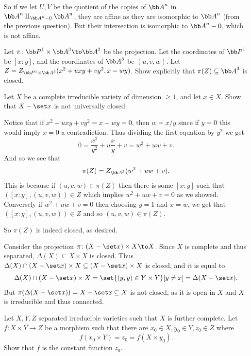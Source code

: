     So if we let $U,V$ be the quotient of the copies of $\bA^n$ in $\bA^n\amalg_{\bA^n-0}\bA^n$, they are affine as they are isomorphic to $\bA^n$ (from the previous question).
    But their intersection is isomorphic to $\bA^n-0$, which is not affine.
\eenum


\bprob

    \benum
        \item Let $\pi\colon\bP^1\times\bA^3\to\bA^3$ be the projection.
        Let the coordinates of $\bP^1$ be $[x:y]$, and the coordinates of $\bA^3$ be $(u,v,w)$.
        Let $Z=Z_{\bP^1\times\bA^3}(x^2+uxy+vy^2,x-wy)$.
        Show explicitly that $\pi(Z)\subseteq\bA^3$ is closed.

        \item Let $X$ be a complete irreducible variety of dimension $\geq1$, and let $x\in X$.
        Show that $X-\set x$ is not universally closed.
    \eenum

\eprob

\benum
    \item Notice that if $x^2+uxy+vy^2=x-wy=0$, then $w=x/y$ since if $y=0$ this would imply $x=0$ a contradiction.
    Thus dividing the first equation by $y^2$ we get
    $$ 0 = \frac{x^2}{y^2} + u\frac xy + v = w^2 + uw + v . $$
    And so we see that
    $$ \pi(Z) = Z_{\bA^3}(w^2+uw+v) . $$
    This is because if $(u,v,w)\in\pi(Z)$ then there is some $[x:y]$ such that $([x:y],(u,v,w))\in Z$ which implies $w^2+uw+v=0$ as we showed.
    Conversely if $w^2+uw+v=0$ then choosing $y=1$ and $x=w$, we get that $([x:y],(u,v,w))\in Z$ and so $(u,v,w)\in\pi(Z)$.

    So $\pi(Z)$ is indeed closed, as desired.

    \item Consider the projection $\pi\colon(X-\set x)\times X\to X$.
    Since $X$ is complete and thus separated, $\Delta(X)\subseteq X\times X$ is closed.
    Thus $\Delta(X)\cap(X-\set x)\times X\subseteq(X-\set x)\times X$ is closed, and it is equal to
    $$ \Delta(X)\cap(X-\set x)\times X = \set{(y,y)\in Y\times Y}[y\neq x] = \Delta(X-\set x) . $$
    But $\pi(\Delta(X-\set x))=X-\set x\subseteq X$ is not closed, as it is open in $X$ and $X$ is irreducible and thus connected.
\eenum

\bprob[title={The rigidity lemma}]

    Let $X,Y,Z$ separated irreducible varieties such that $X$ is further complete.
    Let $f\colon X\times Y\to Z$ be a morphism such that there are $x_0\in X,y_0\in Y,z_0\in Z$ where
    $$ f(x_0\times Y) = z_0 = f(X\times y_0) . $$
    Show that $f$ is the constant function $z_0$.

